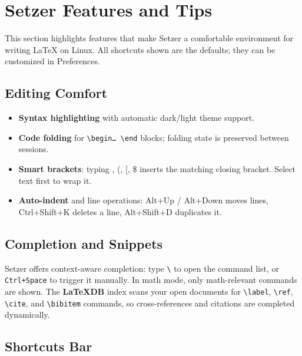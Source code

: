\documentclass[11pt]{article}
\newcommand{\menu}[1]{\textsf{#1}}
\theoremstyle{definition}
\theoremstyle{plain}
\begin{document}
\section{Setzer Features and Tips}
\label{sec:setzer}

This section highlights features that make Setzer a comfortable
environment for writing \LaTeX{} on Linux.
All shortcuts shown are the defaults; they can be customized in
\menu{Preferences}.

\subsection{Editing Comfort}
\label{sec:setzer:editing}

\begin{itemize}[noitemsep]
    \item \textbf{Syntax highlighting} with automatic dark/light theme
          support.
    \item \textbf{Code folding} for \texttt{\textbackslash begin\ldots
          \textbackslash end} blocks; folding state is preserved between
          sessions.
    \item \textbf{Smart brackets}: typing \texttt{\textbraceleft\textbraceright}, (, [, \$ inserts
          the matching closing bracket. Select text first to wrap it.
    \item \textbf{Auto-indent} and line operations:
          \menu{Alt+Up / Alt+Down} moves lines,
          \menu{Ctrl+Shift+K} deletes a line,
          \menu{Alt+Shift+D} duplicates it.
\end{itemize}

\subsection{Completion and Snippets}
\label{sec:setzer:completion}

Setzer offers context-aware completion:
type \texttt{\textbackslash} to open the command list, or
\texttt{Ctrl+Space} to trigger it manually.
In math mode, only math-relevant commands are shown.
The \textbf{LaTeXDB} index scans your open documents for
\texttt{\textbackslash label}, \texttt{\textbackslash ref},
\texttt{\textbackslash cite}, and \texttt{\textbackslash bibitem}
commands, so cross-references and citations are completed dynamically.

\subsection{Shortcuts Bar}
\label{sec:setzer:shortcuts}
\end{document}
